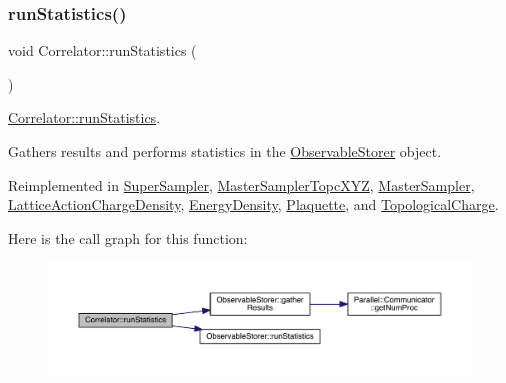 \subsubsection{\texorpdfstring{runStatistics()}{runStatistics()}}
{\footnotesize\ttfamily void Correlator\+::run\+Statistics (\begin{DoxyParamCaption}{ }\end{DoxyParamCaption})\hspace{0.3cm}{\ttfamily [virtual]}}



\mbox{\hyperlink{class_correlator_a35197b1d12b62ef30b79c0138a26456e}{Correlator\+::run\+Statistics}}. 

Gathers results and performs statistics in the \mbox{\hyperlink{class_observable_storer}{Observable\+Storer}} object. 

Reimplemented in \mbox{\hyperlink{class_super_sampler_af96f7d461e9159adb4eef9bda9c6ecde}{Super\+Sampler}}, \mbox{\hyperlink{class_master_sampler_topc_x_y_z_af748653ded9908f78383185475b9ddeb}{Master\+Sampler\+Topc\+X\+YZ}}, \mbox{\hyperlink{class_master_sampler_ab7913d0dbdea57af3f469a3cdd74f8fc}{Master\+Sampler}}, \mbox{\hyperlink{class_lattice_action_charge_density_a21d608703811d2814e7f654588eaa0c0}{Lattice\+Action\+Charge\+Density}}, \mbox{\hyperlink{class_energy_density_a584e164453ce880a45478c9b48ce2c4b}{Energy\+Density}}, \mbox{\hyperlink{class_plaquette_aa54bf1807d9b192048026f94d585fa4f}{Plaquette}}, and \mbox{\hyperlink{class_topological_charge_ab9afadb9f37e638c0a168ebab5d41353}{Topological\+Charge}}.

Here is the call graph for this function\+:
\nopagebreak
\begin{figure}[H]
\begin{center}
\leavevmode
\includegraphics[width=350pt]{class_correlator_a35197b1d12b62ef30b79c0138a26456e_cgraph}
\end{center}
\end{figure}
\mbox{\label{class_correlator_a168512b2ce182d9478db47f100125fa6}} 
